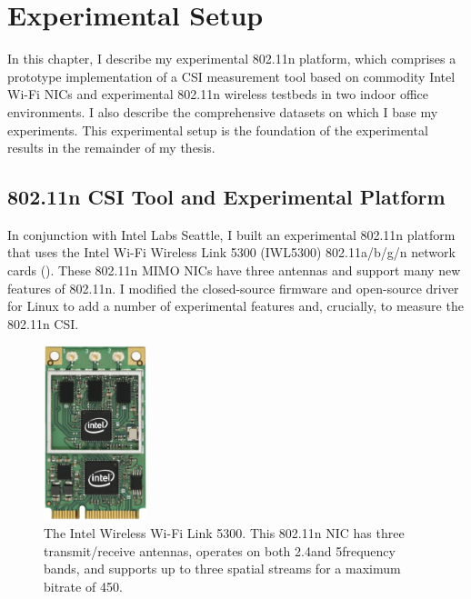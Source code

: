 \ifx\mainfile\undefined

\setcounter{chapter}{4} %
\fi

\cleardoublepage
\chapter{Experimental Setup}
\label{chap:tool}

In this chapter, I describe my experimental 802.11n platform, which comprises a prototype implementation of a CSI measurement tool based on commodity Intel Wi-Fi NICs and experimental 802.11n wireless testbeds in two indoor office environments. I also describe the comprehensive datasets on which I base my experiments. This experimental setup is the foundation of the experimental results in the remainder of my thesis.

\section{802.11n CSI Tool and Experimental Platform}
\label{sec:platform}
In conjunction with Intel Labs Seattle, I built an experimental 802.11n platform that uses the Intel Wi-Fi Wireless Link 5300 (IWL5300) 802.11a/b/g/n network cards (). These 802.11n MIMO NICs have three antennas and support many new features of 802.11n. I modified the closed-source firmware and open-source  driver for Linux to add a number of experimental features and, crucially, to measure the 802.11n CSI.

\begin{figure}
	\centering
	\includegraphics[height=2in]{figures/iwlwifi-5300.jpg}
	\caption[The Intel Wireless Wi-Fi Link 5300]{\label{fig:iwl5300}The Intel Wireless Wi-Fi Link 5300. This 802.11n NIC has three transmit/receive antennas, operates on both 2.4\GHz and 5\GHz frequency bands, and supports up to three spatial streams for a maximum bitrate of 450\Mbps.}
\end{figure}

